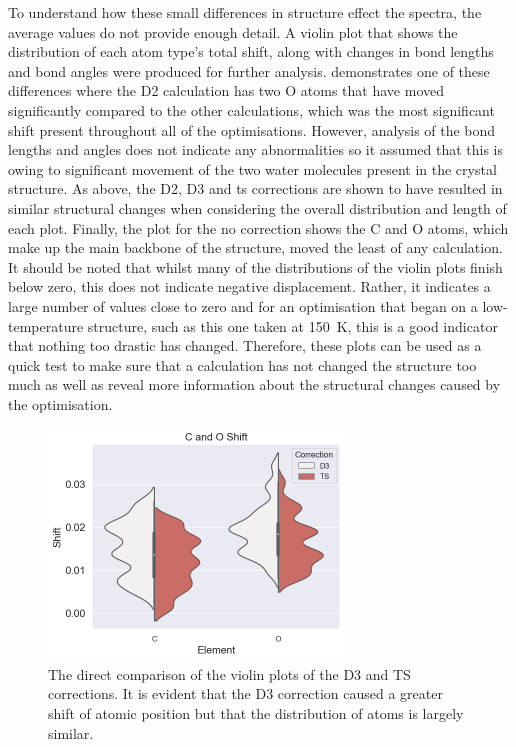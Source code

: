 To understand how these small differences in structure effect the spectra, the average values do not provide enough detail. A violin plot that shows the distribution of each atom type's total shift, along with changes in bond lengths and bond angles were produced for further analysis.  demonstrates one of these differences where the D2 calculation has two O atoms that have moved significantly compared to the other calculations, which was the most significant shift present throughout all of the optimisations. However, analysis of the bond lengths and angles does not indicate any abnormalities so it assumed that this is owing to significant movement of the two water molecules present in the crystal structure. As above, the D2, D3 and \acrshort{ts} corrections are shown to have resulted in similar structural changes when considering the overall distribution and length of each plot. Finally, the plot for the no correction shows the C and O atoms, which make up the main backbone of the structure, moved the least of any calculation. It should be noted that whilst many of the distributions of the violin plots finish below zero, this does not indicate negative displacement. Rather, it indicates a large number of values close to zero and for an optimisation that began on a low-temperature structure, such as this one taken at \SI{150}{K}, this is a good indicator that nothing too drastic has changed. Therefore, these plots can be used as a quick test to make sure that a calculation has not changed the structure too much as well as reveal more information about the structural changes caused by the optimisation. 

\begin{figure}[h]
    \centering
    \includegraphics[width=0.7\textwidth]{Figures/Analysis/IVDW/CO_D3_TS.png}
    \captionsetup{font = footnotesize, justification = centering}
    \caption[The Direct Comparison of the Violin Plots of the D3 and TS Corrections]{The direct comparison of the violin plots of the D3 and TS corrections. It is evident that the D3 correction caused a greater shift of atomic position but that the distribution of atoms is largely similar.}
    \label{fig:TSvsD3}
\end{figure}

